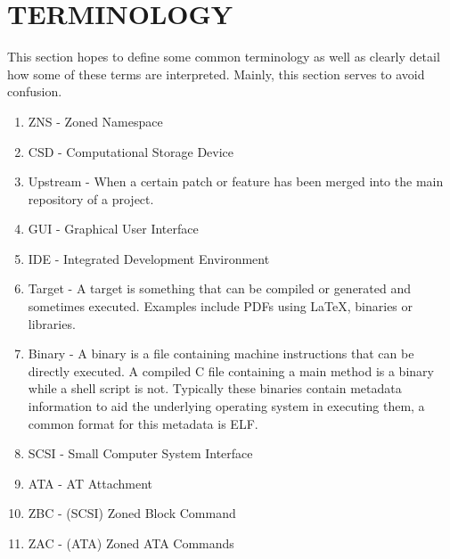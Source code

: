 \documentclass[conference]{IEEEtran}
\newcommand\cstyle{
	\lstset{
		language=c,
		basicstyle=\ttm,
		showstringspaces=false,
		tabsize=4,
		aboveskip=0.2cm,
		belowskip=0.2cm,
		otherkeywords={self},             %
		keywordstyle=\ttb\color{deepblue},
		emph={MyClass,__init__},          %
		emphstyle=\ttb\color{deepred},    %
		stringstyle=\color{deepgreen},
		frame=tb,                          %
		prebreak=\textbackslash,
		linewidth=8.85cm,
		breaklines=true,
	}
}
\newcommand\cexternal[2][]{{\cstyle}}
\begin{document}


\section*{TERMINOLOGY} \label{term}

This section hopes to define some common terminology as well as clearly detail
how some of these terms are interpreted. Mainly, this section serves to avoid
confusion.

\begin{enumerate}
	\item ZNS      - Zoned Namespace
	\item CSD      - Computational Storage Device
	\item Upstream - When a certain patch or feature has been merged into the
					 main repository of a project.
	\item GUI      - Graphical User Interface
	\item IDE      - Integrated Development Environment
	\item Target   - A target is something that can be compiled or generated and
					 sometimes executed. Examples include PDFs using LaTeX,
					 binaries or libraries.
	\item Binary   - A binary is a file containing machine instructions that can
					 be directly executed. A compiled C file containing a main
					 method is a binary while a shell script is not. Typically
					 these binaries contain metadata information to aid the
					 underlying operating system in executing them, a common
					 format for this metadata is ELF.
	\item SCSI     - Small Computer System Interface
	\item ATA      - AT Attachment
	\item ZBC      - (SCSI) Zoned Block Command
	\item ZAC      - (ATA) Zoned ATA Commands
\end{enumerate}



\end{document}
